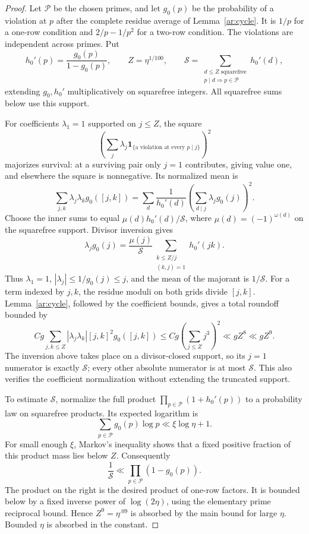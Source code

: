 \begin{proof}
Let $\mathcal P$ be the chosen primes, and let $g_0(p)$ be the probability
of a violation at $p$ after the complete residue average of
Lemma~\ref{ar:cycle}. It is $1/p$ for a one-row condition and
$2/p-1/p^2$ for a two-row condition. The violations are independent across
primes. Put
\[
 h_0'(p)=\frac{g_0(p)}{1-g_0(p)},\qquad
 Z=\eta^{1/100},\qquad
 \mathcal S=\sum_{\substack{d\le Z\text{ squarefree}\\p\mid d\Rightarrow p\in\mathcal P}}
 h_0'(d),
\]
extending $g_0,h_0'$ multiplicatively on squarefree integers.
All squarefree sums below use this support.

For coefficients $\lambda_1=1$ supported on $j\le Z$, the square
\[
 \left(\sum_j\lambda_j
 \mathbf1_{\{\text{a violation at every }p\mid j\}}\right)^2
\]
majorizes survival: at a surviving pair only $j=1$ contributes, giving
value one, and elsewhere the square is nonnegative. Its normalized mean is
\[
 \sum_{j,k}\lambda_j\lambda_k g_0([j,k])
 =\sum_d\frac1{h_0'(d)}
 \left(\sum_{d\mid j}\lambda_jg_0(j)\right)^2.
\]
Choose the inner sums to equal $\mu(d)h_0'(d)/\mathcal S$, where
$\mu(d)=(-1)^{\omega(d)}$ on the squarefree support. Divisor inversion
gives
\[
 \lambda_jg_0(j)=\frac{\mu(j)}{\mathcal S}
 \sum_{\substack{k\le Z/j\\(k,j)=1}}h_0'(jk).
\]
Thus $\lambda_1=1$, $|\lambda_j|\le1/g_0(j)\le j$, and the mean of the
majorant is $1/\mathcal S$. For a term indexed by $j,k$, the residue
moduli on both grids divide $[j,k]$. Lemma~\ref{ar:cycle}, followed by
the coefficient bounds, gives a total roundoff bounded by
\[
 Cg\sum_{j,k\le Z}|\lambda_j\lambda_k|
       [j,k]^2g_0([j,k])
 \le Cg\left(\sum_{j\le Z}j^3\right)^2
 \ll gZ^8\ll gZ^9.
\]
The inversion above takes place on a divisor-closed support, so its
$j=1$ numerator is exactly $\mathcal S$; every other absolute numerator
is at most $\mathcal S$. This also verifies the coefficient normalization
without extending the truncated support.

To estimate $\mathcal S$, normalize the full product
$\prod_{p\in\mathcal P}(1+h_0'(p))$ to a probability law on squarefree
products. Its expected logarithm is
\[
 \sum_{p\in\mathcal P}g_0(p)\log p
 \ll\xi\log\eta+1.
\]
For small enough $\xi$, Markov's inequality shows that a fixed positive
fraction of this product mass lies below $Z$. Consequently
\[
 \frac1{\mathcal S}\ll
 \prod_{p\in\mathcal P}(1-g_0(p)).
\]
The product on the right is the desired product of one-row factors. It
is bounded below by a fixed inverse power of $\log(2\eta)$, using the
elementary prime reciprocal bound. Hence $Z^9=\eta^{.09}$ is absorbed
by the main bound for large $\eta$. Bounded $\eta$ is absorbed in the
constant.
\end{proof}

